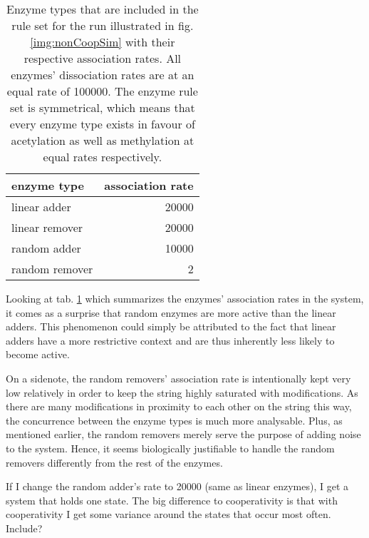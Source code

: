         \begin{table}[htbp!]
            \caption{Enzyme types that are included in the rule set for the run illustrated in fig. \ref{img:nonCoopSim} with their respective association rates. All enzymes' dissociation rates are at an equal rate of 100000. The enzyme rule set is symmetrical, which means that every enzyme type exists in favour of acetylation as well as methylation at equal rates respectively.}
            \begin{center}
                \begin{tabular}{l r}
                    \hline
                    \textbf{enzyme type} & \textbf{association rate} \\
                    \hline
                    linear adder & 20000 \\
                    linear remover & 20000 \\
                    random adder & 10000 \\
                    random remover & 2 \\
                    \hline
                \end{tabular}
            \end{center}
            \label{tab:nonCoopSimRates}
        \end{table}

        Looking at tab. \ref{tab:nonCoopSimRates} which summarizes the enzymes' association rates in the system, it comes as a surprise that random enzymes are more active than the linear adders. This phenomenon could simply be attributed to the fact that linear adders have a more restrictive context and are thus inherently less likely to become active.

        On a sidenote, the random removers' association rate is intentionally kept very low relatively in order to keep the string highly saturated with modifications. As there are many modifications in proximity to each other on the string this way, the concurrence between the enzyme types is much more analysable. Plus, as mentioned earlier, the random removers merely serve the purpose of adding noise to the system. Hence, it seems biologically justifiable to handle the random removers differently from the rest of the enzymes.

        \begin{itemize}
            {
                \color{red}
                \item If I change the random adder's rate to 20000 (same as linear enzymes), I get a system that holds one state. The big difference to cooperativity is that with cooperativity I get some variance around the states that occur most often. Include?
            }
        \end{itemize}
    \newpage
